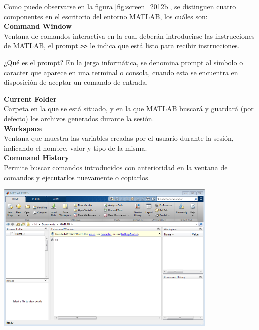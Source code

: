 Como puede observarse en la figura \ref{fig:screen_2012b}, se
distinguen cuatro componentes en el escritorio del entorno MATLAB, los
cuáles son: \\

\textbf{Command Window} \\

Ventana de comandos interactiva en la cual deberán introducirse las
instrucciones de MATLAB, el prompt \verb|>>| le indica que está listo para 
recibir instrucciones. \\

\begin{informacion}{¿Qué es el prompt?}
En la jerga informática, se denomina prompt al símbolo o
caracter que aparece en una terminal o consola, cuando
esta se encuentra en disposición de aceptar un comando
de entrada.
\end{informacion}

\textbf{Current Folder} \\

Carpeta en la que se está situado, y en la que MATLAB buscará y guardará
(por defecto) los archivos generados durante la sesión. \\

\textbf{Workspace} \\

Ventana que muestra las variables creadas por el usuario durante la
sesión, indicando el nombre, valor y tipo de la misma. \\

\textbf{Command History} \\

Permite buscar comandos introducidos con anterioridad en la ventana de
comandos y ejecutarlos nuevamente o copiarlos. \\

\begin{center}
\includegraphics[width=0.8\textwidth]{src/img/ch1/img_1_1.png}
\label{fig:screen_2012b}
\end{center}

